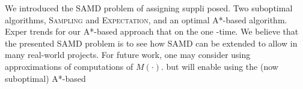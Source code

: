 \documentclass[letterpaper]{article} %
\newcommand{\samd}{\ac{SAMD}\xspace}
\newcommand{\astar}{\textsc{A*}\xspace}
\newcommand{\sampling}{\textsc{Sampling}\xspace}
\newcommand{\expectation}{\textsc{Expectation}\xspace}
\newcommand{\optapprox}{\textsc{OptApprox}\xspace}
\begin{document}
We introduced the \samd problem of assigning suppli posed. Two suboptimal algorithms, \sampling and \expectation, and an optimal \astar-based algorithm. %
Exper  trends for our \astar-based approach that on the one   -time.
We believe that the presented \samd problem is    to see how \samd can be extended to allow  in many real-world projects.
For future work, one may consider using approximations of computations of $M(\cdot)$.
 but will enable using the (now suboptimal) \astar-based 


\end{document}
